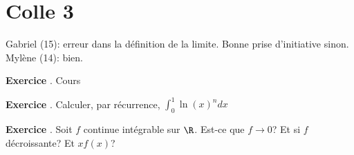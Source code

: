 \documentclass[10pt,a4paper]{article}
\newcounter{question}
\newcounter{exo}
\newenvironment{exo}{\vspace{0.5cm}\setcounter{question}{0}\addtocounter{exo}{1} \noindent \textbf{Exercice \theexo}. \normalsize }{\par}
\begin{document}
	\section*{Colle 3}
	\setcounter{exo}{0}
	Gabriel (15): erreur dans la définition de la limite. Bonne prise d'initiative sinon.\\
	Mylène (14): bien.
	\begin{exo}
		Cours
	\end{exo}

	\begin{exo}
		Calculer, par récurrence, $\int_0^1 \ln(x)^n dx$
	\end{exo}

	\begin{exo}
		Soit $f$ continue intégrable sur $\R$. Est-ce que $f \longrightarrow 0$? Et si $f$ décroissante? Et $xf(x)$?
	\end{exo}
\end{document}
